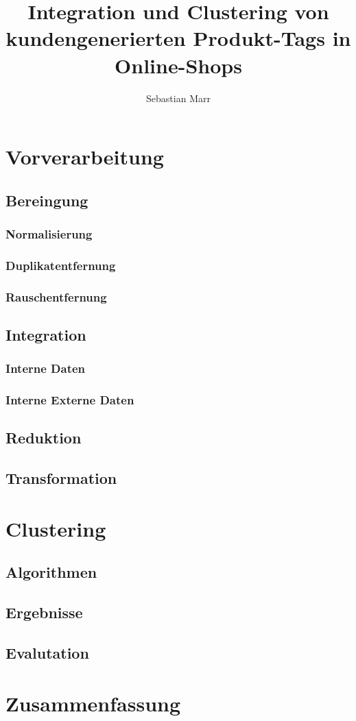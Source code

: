 \documentclass[a4paper, abstracton, DIV=calc]{scrreprt}
\author{Sebastian Marr}
\title{Integration und Clustering von kundengenerierten Produkt-Tags in Online-Shops}
\begin{document}
\maketitle



\tableofcontents



\chapter{Vorverarbeitung}

\section{Bereingung}
\subsection{Normalisierung}
\subsection{Duplikatentfernung}
\subsection{Rauschentfernung}

\section{Integration}
\subsection{Interne Daten}
\subsection{Interne Externe Daten}

\section{Reduktion}

\section{Transformation}

\chapter{Clustering}

\section{Algorithmen}
\section{Ergebnisse}
\section{Evalutation}

\chapter{Zusammenfassung}

\nocite{*}


\clearpage
{}

\end{document}
